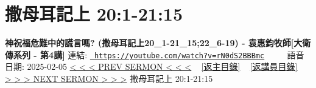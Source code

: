 \documentclass{book}
\begin{document}
\section{撒母耳記上 20:1-21:15}
\label{sec:rN0dS2BBBmc}
\textbf{神祝福危難中的謊言嗎?  (撒母耳記上20\_1-21\_15;22\_6-19) - 袁惠鈞牧師[大衛傳系列 - 第4講]}
\newline
\newline
連結: \href{https://youtube.com/watch?v=rN0dS2BBBmc}{\texttt{ https://youtube.com/watch?v=rN0dS2BBBmc}} ~~~~ 語音日期: 2025-02-05 
\newline
\newline
\hyperref[sec:9t69tF6ci0k]{< < < PREV SERMON < < <}
~
\hyperlink{toc}{[返主目錄]}
~
\hyperref[ch:preacher6]{[返講員目錄]}
~
\hyperref[sec:WCt7vYrgwVY]{> > > NEXT SERMON > > >}
\newline
\newline
撒母耳記上 20:1-21:15
\newline
\end{document}
